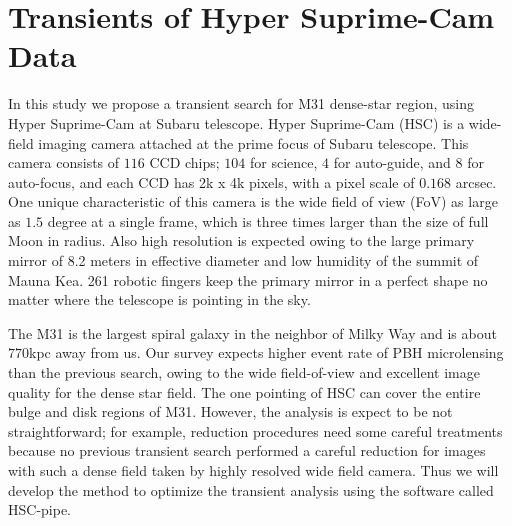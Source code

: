 \documentclass[iop, apj]{emulateapj}
\newcommand{\?}{\stackrel{?}{=}}
\begin{document}

\section{Transients of Hyper Suprime-Cam Data}
In this study we propose a transient search for M31 dense-star region, using Hyper Suprime-Cam at Subaru telescope. Hyper Suprime-Cam (HSC) is a wide-field imaging camera attached at the prime focus of Subaru telescope. This camera consists of $116$ CCD chips; $104$ for science, $4$ for auto-guide, and $8$ for auto-focus,  and each CCD has 2k x 4k pixels, with a pixel scale of $0.168$ arcsec. One unique characteristic of this camera is the wide field of view (FoV) as large as $1.5$ degree at a single frame, which is three times larger than the size of full Moon in radius. Also high resolution is expected owing to the large primary mirror of 8.2 meters in effective diameter and low humidity of the summit of Mauna Kea. 261 robotic fingers keep the primary mirror in a perfect shape no matter where the telescope is pointing in the sky. 

The M31 is the largest spiral galaxy in the neighbor of Milky Way and is about $770$kpc away from us. 
Our survey expects higher event rate of PBH microlensing than the previous search, owing to the wide field-of-view and excellent image quality for the dense star field. The one pointing of HSC can cover the entire bulge and disk regions of M31. However, the analysis is expect to be not straightforward; for example, reduction procedures need some careful treatments because no previous transient search performed a careful reduction for images with such a dense field taken by highly resolved wide field camera. 
Thus we will develop the method to optimize the transient analysis using the software called HSC-pipe. 
\end{document}
